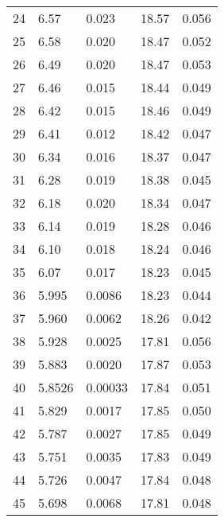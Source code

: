 \begin{table}
\begin{tabular}{c|ll|ll}
24 & 6.57 & 0.023 & 18.57 & 0.056 \\
25 & 6.58 & 0.020 & 18.47 & 0.052 \\
26 & 6.49 & 0.020 & 18.47 & 0.053 \\
27 & 6.46 & 0.015 & 18.44 & 0.049 \\
28 & 6.42 & 0.015 & 18.46 & 0.049 \\
29 & 6.41 & 0.012 & 18.42 & 0.047 \\
30 & 6.34 & 0.016 & 18.37 & 0.047 \\
31 & 6.28 & 0.019 & 18.38 & 0.045 \\
32 & 6.18 & 0.020 & 18.34 & 0.047 \\
33 & 6.14 & 0.019 & 18.28 & 0.046 \\
34 & 6.10 & 0.018 & 18.24 & 0.046 \\
35 & 6.07 & 0.017 & 18.23 & 0.045 \\
36 & 5.995 & 0.0086 & 18.23 & 0.044 \\
37 & 5.960 & 0.0062 & 18.26 & 0.042 \\
38 & 5.928 & 0.0025 & 17.81 & 0.056 \\
39 & 5.883 & 0.0020 & 17.87 & 0.053 \\
40 & 5.8526 & 0.00033 & 17.84 & 0.051 \\
41 & 5.829 & 0.0017 & 17.85 & 0.050 \\
42 & 5.787 & 0.0027 & 17.85 & 0.049 \\
43 & 5.751 & 0.0035 & 17.83 & 0.049 \\
44 & 5.726 & 0.0047 & 17.84 & 0.048 \\
45 & 5.698 & 0.0068 & 17.81 & 0.048 \\
               \hline
        \end{tabular}
    \end{table}
    \clearpage

